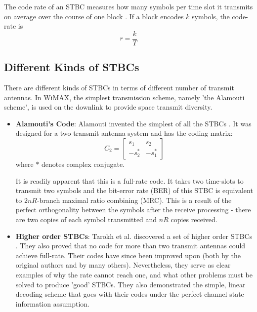 \documentclass{book}
\begin{document}
The code rate of an STBC measures how many symbols per time slot it transmits on average over the course of one block \cite{17}. If a block encodes $k$ symbols, the code-rate is
\[r=\frac{k}{T}\]

\subsection{Different Kinds of STBCs}
There are different kinds of STBCs in terms of different number of transmit antennas. In WiMAX, the simplest transmission scheme, namely 'the Alamouti scheme', is used on the downlink to provide space transmit diversity.

\begin{itemize}
\item {\bf Alamouti's Code}: Alamouti invented the simplest of all the STBCs \cite{11}. It was designed for a two transmit antenna system and has the coding matrix:
\[C_2=
\left[\begin{array}{cc}
s_1 & s_2\\
-s_2^* & -s_1^*
\end{array} \right]\]
where $*$ denotes complex conjugate.

It is readily apparent that this is a full-rate code. It takes two time-slots to transmit two symbols and the bit-error rate (BER) of this STBC is equivalent to $2nR$-branch maximal ratio combining (MRC). This is a result of the perfect orthogonality between the symbols after the receive processing - there are two copies of each symbol transmitted and $nR$ copies received.

\item {\bf Higher order STBCs}: Tarokh et al. discovered a set of higher order STBCs \cite{17, 18}. They also proved that no code for more than two transmit antennas could achieve full-rate. Their codes have since been improved upon (both by the original authors and by many others). Nevertheless, they serve as clear examples of why the rate cannot reach one, and what other problems must be solved to produce 'good' STBCs. They also demonstrated the simple, linear decoding scheme that goes with their codes under the perfect channel state information assumption.


\end{itemize}
\end{document}
